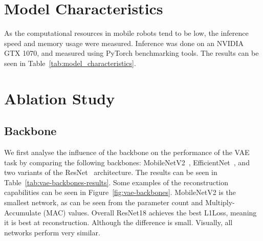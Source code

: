 \section{Model Characteristics}

As the computational resources in mobile robots tend to be low, the inference speed and memory usage were measured. Inference was done on an NVIDIA GTX 1070, and measured using PyTorch benchmarking tools. The results can be seen in Table~\ref{tab:model_characteristics}.




\section{Ablation Study}
\subsection{Backbone}
We first analyse the influence of the backbone on the performance of the VAE task by comparing the following backbones: MobileNetV2~\cite{sandler2019mobilenetv2invertedresidualslinear}, EfficientNet~\cite{tan2020efficientnetrethinkingmodelscaling}, and two variants of the ResNet~\cite{he2015deep} architecture. The results can be seen in Table~\ref{tab:vae-backbones-results}. Some examples of the reconstruction capabilities can be seen in Figure~\ref{fig:vae-backbones}. MobileNetV2 is the smallest network, as can be seen from the parameter count and Multiply-Accumulate (MAC) values. Overall ResNet18 achieves the best L1Loss, meaning it is best at reconstruction. Although the difference is small. Visually, all networks perform very similar.

